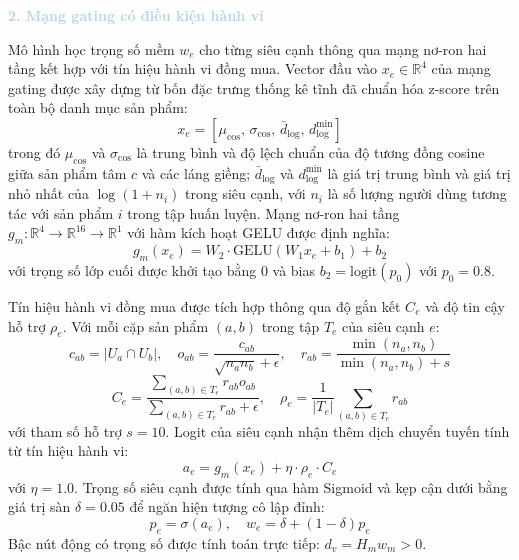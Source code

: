 \noindent\textcolor{lightblue}{\textbf{2. Mạng gating có điều kiện hành vi}}

Mô hình học trọng số mềm $w_e$ cho từng siêu cạnh thông qua mạng nơ-ron hai tầng kết hợp với tín hiệu hành vi đồng mua. Vector đầu vào $x_e \in \mathbb{R}^4$ của mạng gating được xây dựng từ bốn đặc trưng thống kê tĩnh đã chuẩn hóa z-score trên toàn bộ danh mục sản phẩm:
\begin{equation}
x_e = \left[ \mu_{\cos}, \, \sigma_{\cos}, \, \bar{d}_{\log}, \, d_{\log}^{\min} \right]
\end{equation}
trong đó $\mu_{\cos}$ và $\sigma_{\cos}$ là trung bình và độ lệch chuẩn của độ tương đồng cosine giữa sản phẩm tâm $c$ và các láng giềng; $\bar{d}_{\log}$ và $d_{\log}^{\min}$ là giá trị trung bình và giá trị nhỏ nhất của $\log(1 + n_i)$ trong siêu cạnh, với $n_i$ là số lượng người dùng tương tác với sản phẩm $i$ trong tập huấn luyện. Mạng nơ-ron hai tầng $g_m: \mathbb{R}^4 \to \mathbb{R}^{16} \to \mathbb{R}^1$ với hàm kích hoạt GELU được định nghĩa:
\begin{equation}
g_m(x_e) = W_2 \cdot \text{GELU}(W_1 x_e + b_1) + b_2
\end{equation}
với trọng số lớp cuối được khởi tạo bằng 0 và bias $b_2 = \text{logit}(p_0)$ với $p_0 = 0.8$.

Tín hiệu hành vi đồng mua được tích hợp thông qua độ gắn kết $C_e$ và độ tin cậy hỗ trợ $\rho_e$. Với mỗi cặp sản phẩm $(a, b)$ trong tập $T_e$ của siêu cạnh $e$:
\begin{equation}
c_{ab} = |U_a \cap U_b|, \quad o_{ab} = \frac{c_{ab}}{\sqrt{n_a n_b} + \epsilon}, \quad r_{ab} = \frac{\min(n_a, n_b)}{\min(n_a, n_b) + s}
\end{equation}
\begin{equation}
C_e = \frac{\sum_{(a,b) \in T_e} r_{ab} o_{ab}}{\sum_{(a,b) \in T_e} r_{ab} + \epsilon}, \quad \rho_e = \frac{1}{|T_e|} \sum_{(a,b) \in T_e} r_{ab}
\end{equation}
với tham số hỗ trợ $s = 10$. Logit của siêu cạnh nhận thêm dịch chuyển tuyến tính từ tín hiệu hành vi:
\begin{equation}
a_e = g_m(x_e) + \eta \cdot \rho_e \cdot C_e
\end{equation}
với $\eta = 1.0$. Trọng số siêu cạnh được tính qua hàm Sigmoid và kẹp cận dưới bằng giá trị sàn $\delta = 0.05$ để ngăn hiện tượng cô lập đỉnh:
\begin{equation}
p_e = \sigma(a_e), \quad w_e = \delta + (1 - \delta) p_e
\end{equation}
Bậc nút động có trọng số được tính toán trực tiếp: $d_v = H_m w_m > 0$.

